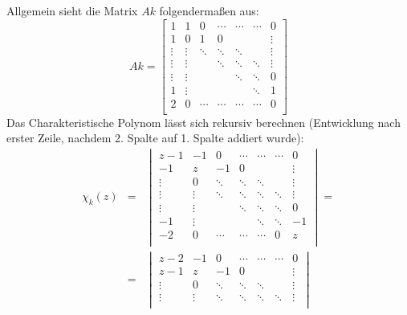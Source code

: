 \begin{flushenum}
\item Allgemein sieht die Matrix $Ak$ folgendermaßen aus:
	\[ Ak = \begin{bmatrix}
			1      & 1      & 0      & \cdots & \cdots & \cdots & 0      \\
			1      & 0      & 1      & 0      &        &        & \vdots \\
			\vdots & \vdots & \ddots & \ddots & \ddots &        & \vdots \\
			\vdots & \vdots &        & \ddots & \ddots & \ddots & \vdots \\
			\vdots & \vdots &        &        & \ddots & \ddots & 0      \\
			1      & \vdots &        &        &        & \ddots & 1      \\
			2      & 0      & \cdots & \cdots & \cdots & \cdots & 0      \\
		\end{bmatrix} \]
	Das Charakteristische Polynom lässt sich rekursiv berechnen (Entwicklung nach erster Zeile,
	nachdem 2. Spalte auf 1. Spalte addiert wurde):
	\begin{eqnarray*}
		\chi_k(z) &=&
				\begin{vmatrix}
					z-1    & -1     & 0      & \cdots & \cdots & \cdots & 0      \\
					-1     & z      & -1     & 0      &        &        & \vdots \\
					\vdots & 0      & \ddots & \ddots & \ddots &        & \vdots \\
					\vdots & \vdots & \ddots & \ddots & \ddots & \ddots & \vdots \\
					\vdots & \vdots &        & \ddots & \ddots & \ddots & 0      \\
					-1     & \vdots &        &        & \ddots & \ddots & -1     \\
					-2     & 0      & \cdots & \cdots & \cdots & 0      & z      \\
				\end{vmatrix} = \\
			&=&
				\begin{vmatrix}
					z-2    & -1     & 0      & \cdots & \cdots & \cdots & 0      \\
					z-1    & z      & -1     & 0      &        &        & \vdots \\
					\vdots & 0      & \ddots & \ddots & \ddots &        & \vdots \\
					\vdots & \vdots & \ddots & \ddots & \ddots & \ddots & \vdots \\

\end{vmatrix}
\end{eqnarray*}
\end{flushenum}
